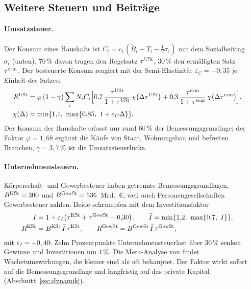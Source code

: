 \subsection{Weitere Steuern und Beiträge}
\label{sec:steuern}

\paragraph{Umsatzsteuer.} Der Konsum eines Haushalts ist
$C_i = c_i\,(\tilde B_i - T_i - \tfrac12\sigma_i)$ mit dem Sozialbeitrag
$\sigma_i$ (unten). 70\,\% davon tragen den Regelsatz $\tau^{\mathrm{USt}}$,
30\,\% den ermäßigten Satz $\tau^{\mathrm{erm}}$. Der besteuerte Konsum reagiert
mit der Semi-Elastizität $\varepsilon_C = -0{,}35$ je Einheit des Satzes:
\begin{equation}
\begin{split}
  R^{\mathrm{USt}} &= \varphi\,(1-\gamma)\sum_i N_i C_i
  \Bigl[0{,}7\,\frac{\tau^{\mathrm{USt}}}{1+\tau^{\mathrm{USt}}}\,\chi\bigl(\Delta\tau^{\mathrm{USt}}\bigr)
      + 0{,}3\,\frac{\tau^{\mathrm{erm}}}{1+\tau^{\mathrm{erm}}}\,\chi\bigl(\Delta\tau^{\mathrm{erm}}\bigr)\Bigr],\\
  \chi(\Delta) &= \min\{1{,}1,\ \max\{0{,}85,\ 1 + \varepsilon_C\Delta\}\}.
\end{split}
\end{equation}
Der Konsum der Haushalte erfasst nur rund 60\,\% der Bemessungsgrundlage; der
Faktor $\varphi = 1{,}68$ ergänzt die Käufe von Staat, Wohnungsbau und
befreiten Branchen, $\gamma = 3{,}7\,\%$ ist die Umsatzsteuerlücke.

\paragraph{Unternehmensteuern.} Körperschaft- und Gewerbesteuer haben
getrennte Bemessungsgrundlagen, $B^{\mathrm{KSt}} = 300$ und
$B^{\mathrm{GewSt}} = 536$~Mrd.~\euro{}, weil auch Personengesellschaften
Gewerbesteuer zahlen. Beide schrumpfen mit dem Investitionsfaktor
\begin{equation}
\begin{split}
  I &= 1 + \varepsilon_I\bigl(\tau^{\mathrm{KSt}} + \tau^{\mathrm{GewSt}} - 0{,}30\bigr),
  \qquad \bar I = \min\{1{,}2,\ \max\{0{,}7,\ I\}\},\\
  R^{\mathrm{KSt}} &= B^{\mathrm{KSt}}\,\bar I\,\tau^{\mathrm{KSt}},
  \qquad
  R^{\mathrm{GewSt}} = B^{\mathrm{GewSt}}\,\bar I\,\tau^{\mathrm{GewSt}},
\end{split}
\end{equation}
mit $\varepsilon_I = -0{,}40$: Zehn Prozentpunkte Unternehmensteuerlast über
30\,\% senken Gewinne und Investitionen um 4\,\%. Die Meta-Analyse von
\textcite{gechert2022} findet Wachstumswirkungen, die kleiner sind als oft
behauptet. Der Faktor wirkt sofort auf die Bemessungsgrundlage und
langfristig auf das private Kapital (Abschnitt~\ref{sec:dynamik}).

